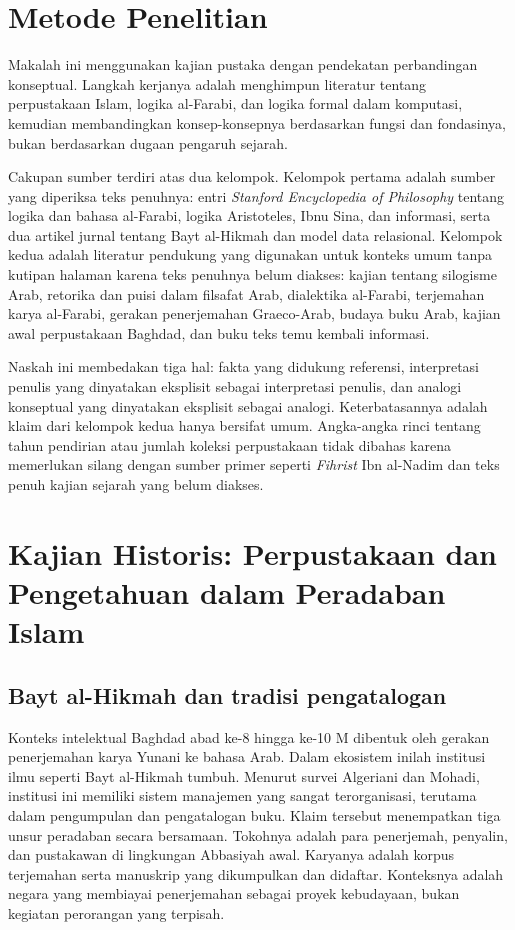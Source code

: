 \documentclass[12pt,a4paper]{article}
\begin{document}
\section{Metode Penelitian}

Makalah ini menggunakan kajian pustaka dengan pendekatan perbandingan konseptual. Langkah kerjanya adalah menghimpun literatur tentang perpustakaan Islam, logika al-Farabi, dan logika formal dalam komputasi, kemudian membandingkan konsep-konsepnya berdasarkan fungsi dan fondasinya, bukan berdasarkan dugaan pengaruh sejarah.

Cakupan sumber terdiri atas dua kelompok. Kelompok pertama adalah sumber yang diperiksa teks penuhnya: entri \emph{Stanford Encyclopedia of Philosophy} tentang logika dan bahasa al-Farabi, logika Aristoteles, Ibnu Sina, dan informasi, serta dua artikel jurnal tentang Bayt al-Hikmah dan model data relasional. Kelompok kedua adalah literatur pendukung yang digunakan untuk konteks umum tanpa kutipan halaman karena teks penuhnya belum diakses: kajian tentang silogisme Arab, retorika dan puisi dalam filsafat Arab, dialektika al-Farabi, terjemahan karya al-Farabi, gerakan penerjemahan Graeco-Arab, budaya buku Arab, kajian awal perpustakaan Baghdad, dan buku teks temu kembali informasi.

Naskah ini membedakan tiga hal: fakta yang didukung referensi, interpretasi penulis yang dinyatakan eksplisit sebagai interpretasi penulis, dan analogi konseptual yang dinyatakan eksplisit sebagai analogi. Keterbatasannya adalah klaim dari kelompok kedua hanya bersifat umum. Angka-angka rinci tentang tahun pendirian atau jumlah koleksi perpustakaan tidak dibahas karena memerlukan silang dengan sumber primer seperti \emph{Fihrist} Ibn al-Nadim dan teks penuh kajian sejarah yang belum diakses.

\section{Kajian Historis: Perpustakaan dan Pengetahuan dalam Peradaban Islam}

\subsection{Bayt al-Hikmah dan tradisi pengatalogan}

Konteks intelektual Baghdad abad ke-8 hingga ke-10 M dibentuk oleh gerakan penerjemahan karya Yunani ke bahasa Arab.\autocite{gutas1998} Dalam ekosistem inilah institusi ilmu seperti Bayt al-Hikmah tumbuh. Menurut survei Algeriani dan Mohadi, institusi ini memiliki sistem manajemen yang sangat terorganisasi, terutama dalam pengumpulan dan pengatalogan buku.\autocite{algeriani-mohadi2017} Klaim tersebut menempatkan tiga unsur peradaban secara bersamaan. Tokohnya adalah para penerjemah, penyalin, dan pustakawan di lingkungan Abbasiyah awal. Karyanya adalah korpus terjemahan serta manuskrip yang dikumpulkan dan didaftar. Konteksnya adalah negara yang membiayai penerjemahan sebagai proyek kebudayaan, bukan kegiatan perorangan yang terpisah.
\end{document}
